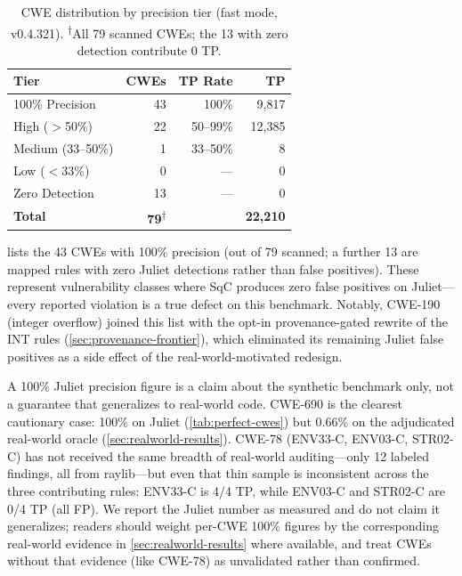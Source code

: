 \begin{table}[t]
\centering
\footnotesize
\begin{tabular}{@{}lrrr@{}}
\toprule
\textbf{Tier} & \textbf{CWEs} & \textbf{TP Rate} & \textbf{TP} \\
\midrule
100\% Precision & 43 & 100\% & 9,817 \\
High ($>$50\%) & 22 & 50--99\% & 12,385 \\
Medium (33--50\%) & 1 & 33--50\% & 8 \\
Low ($<$33\%) & 0 & --- & 0 \\
Zero Detection & 13 & --- & 0 \\
\midrule
\textbf{Total} & \textbf{79}\textsuperscript{$\dagger$} & & \textbf{22,210} \\
\bottomrule
\end{tabular}
\caption{CWE distribution by precision tier (fast mode, v0.4.321).
\textsuperscript{$\dagger$}All 79 scanned CWEs; the 13 with zero
detection contribute 0 TP.}
\label{tab:precision-tiers}
\end{table}

 lists the 43 CWEs with 100\% precision (out of
79 scanned; a further 13 are mapped rules with zero Juliet detections
rather than false positives).  These represent vulnerability classes
where SqC produces zero false positives on Juliet---every reported
violation is a true defect on this benchmark.  Notably, CWE-190
(integer overflow) joined this list with the opt-in provenance-gated
rewrite of the INT rules (\cref{sec:provenance-frontier}), which
eliminated its remaining Juliet false positives as a side effect of the
real-world-motivated redesign.

A 100\% Juliet precision figure is a claim about the synthetic
benchmark only, not a guarantee that generalizes to real-world code.
CWE-690 is the clearest cautionary case: 100\% on Juliet
(\cref{tab:perfect-cwes}) but 0.66\% on the adjudicated real-world
oracle (\cref{sec:realworld-results}). CWE-78 (ENV33-C, ENV03-C,
STR02-C) has not received the same breadth of real-world auditing---only
12 labeled findings, all from raylib---but even that thin sample is
inconsistent across the three contributing rules: ENV33-C is 4/4 TP,
while ENV03-C and STR02-C are 0/4 TP (all FP). We report the Juliet
number as measured and do not claim it generalizes; readers should
weight per-CWE 100\% figures by the corresponding real-world evidence
in \cref{sec:realworld-results} where available, and treat CWEs
without that evidence (like CWE-78) as unvalidated rather than
confirmed.

